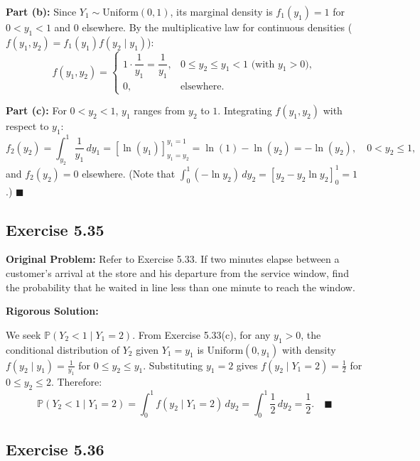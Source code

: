 \documentclass[11pt, letterpaper]{article}
\theoremstyle{definition}
\theoremstyle{remark}
\newcommand{\Prob}{\mathbb{P}}
\begin{document}
\textbf{Part (b):} Since $Y_1 \sim \text{Uniform}(0, 1)$, its marginal density is $f_1(y_1) = 1$ for $0 < y_1 < 1$ and $0$ elsewhere. By the multiplicative law for continuous densities ($f(y_1, y_2) = f_1(y_1)f(y_2 \mid y_1)$):
\[ f(y_1, y_2) = \begin{cases} 1 \cdot \dfrac{1}{y_1} = \dfrac{1}{y_1}, & 0 \le y_2 \le y_1 < 1 \text{ (with } y_1 > 0\text{)}, \\ 0, & \text{elsewhere.} \end{cases} \]

\textbf{Part (c):} For $0 < y_2 < 1$, $y_1$ ranges from $y_2$ to $1$. Integrating $f(y_1, y_2)$ with respect to $y_1$:
\[ f_2(y_2) = \int_{y_2}^1 \frac{1}{y_1} \, dy_1 = \left[ \ln(y_1) \right]_{y_1=y_2}^{y_1=1} = \ln(1) - \ln(y_2) = -\ln(y_2), \quad 0 < y_2 \le 1, \]
and $f_2(y_2) = 0$ elsewhere. (Note that $\int_0^1 (-\ln y_2) \, dy_2 = \left[ y_2 - y_2 \ln y_2 \right]_0^1 = 1$.) $\blacksquare$

\subsection{Exercise 5.35}

\textbf{Original Problem:}
Refer to Exercise 5.33. If two minutes elapse between a customer's arrival at the store and his departure from the service window, find the probability that he waited in line less than one minute to reach the window.

\textbf{Rigorous Solution:}

We seek $\Prob(Y_2 < 1 \mid Y_1 = 2)$. From Exercise 5.33(c), for any $y_1 > 0$, the conditional distribution of $Y_2$ given $Y_1 = y_1$ is $\text{Uniform}(0, y_1)$ with density $f(y_2 \mid y_1) = \frac{1}{y_1}$ for $0 \le y_2 \le y_1$. Substituting $y_1 = 2$ gives $f(y_2 \mid Y_1 = 2) = \frac{1}{2}$ for $0 \le y_2 \le 2$. Therefore:
\[ \Prob(Y_2 < 1 \mid Y_1 = 2) = \int_0^1 f(y_2 \mid Y_1 = 2) \, dy_2 = \int_0^1 \frac{1}{2} \, dy_2 = \frac{1}{2}. \quad \blacksquare \]

\subsection{Exercise 5.36}
\end{document}
